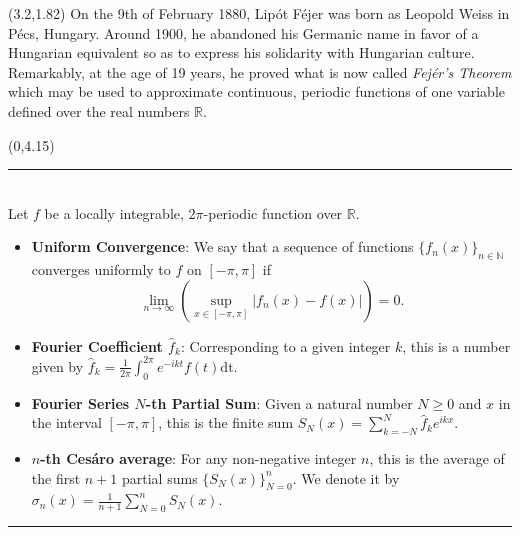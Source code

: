 \documentclass[a1,portrait]{a0poster}
\def\LHead#1{\noindent{\LARGE\color{DarkBlue}\sf #1}\bigskip}
\begin{document}
    \begin{textblock}{3.8}(3.2,1.82)
    \sf
    On the 9th of February 1880, Lip\'ot F\'ejer was born as Leopold Weiss in P\'ecs, Hungary. Around 1900, he abandoned his Germanic name in favor of a Hungarian equivalent so as to express his solidarity with Hungarian culture. Remarkably, at the age of 19 years, he proved what is now called \emph{Fej\'er's Theorem} which may be used to approximate continuous, periodic functions of one variable defined over the real numbers $\mathbb{R}$.   
    \bigskip

    \end{textblock}
    \begin{textblock}{7}(0,4.15)
    \bigskip
    \hrule
    \LHead{\textbf{Definitions}}\\
    \sf \vspace{-2mm}
    Let $f$ be a locally integrable, $2\pi$-periodic function over $\mathbb{R}$.
    
    \begin{itemize}
    
    \item \textbf{Uniform Convergence}: We say that a sequence of functions $\{f_n(x)\}_{n \in\mathbb{N}}$ converges uniformly to $f$ on $[-\pi,\pi]$ if $$\lim_{n\to \infty}\left( \sup_{x\in [-\pi,\pi]}|f_{n}(x)-f(x)|\right)=0.$$ 
    \item \textbf{Fourier Coefficient $\hat{f}_k$}: Corresponding to a given integer $k$, this is a number given by
    $\hat{f}_k=\frac{1}{2\pi}\int_0^{2\pi}e^{-ikt}f(t)\text{dt}$.
    \item \textbf{Fourier Series $N$-th Partial Sum}: Given a natural number $N\geq 0$ and $x$ in the interval $[-\pi,\pi]$, this is the finite sum  $S_N(x)=\sum_{k=-N}^{N} \hat{f}_k e^{ikx}$.
    \item \textbf{$n$-th Ces\'aro average}: For any non-negative integer $n$, this is the average of the first $n+1$ partial sums $\{S_N(x)\}_{N=0}^{n}$. We denote it by $\sigma_n(x)=\frac{1}{n+1}\sum_{N=0}^nS_N(x)$.
    \end{itemize}
    \bigskip
    \hrule
    \end{textblock}
\end{document}
